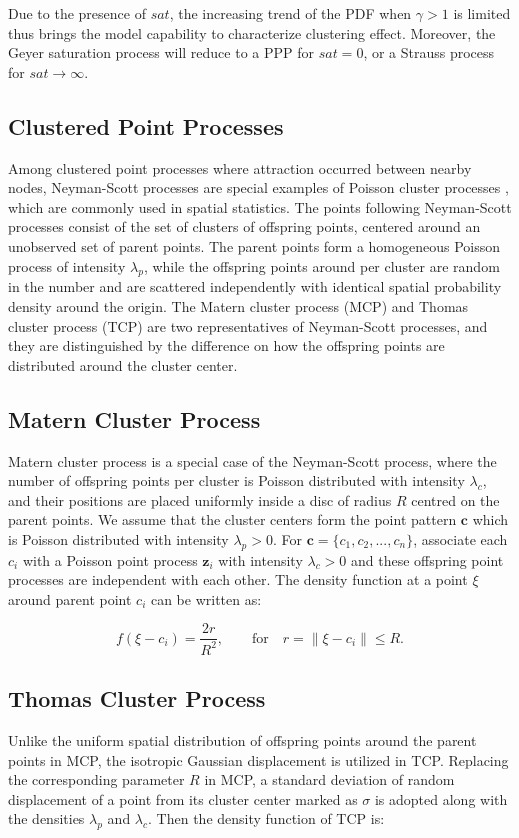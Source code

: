 Due to the presence of $sat$, the increasing trend of the PDF when $\gamma>1$ is limited thus brings the model capability to characterize clustering effect. Moreover, the Geyer saturation process will reduce to a PPP for $sat=0$, or a Strauss process for $sat\to\infty$.

\subsection{Clustered Point Processes}
Among clustered point processes where attraction occurred between nearby nodes, Neyman-Scott processes are special examples of Poisson cluster processes \cite{chiu2013stochastic}, which are commonly used in spatial statistics. The points following Neyman-Scott processes consist of the set of clusters of offspring points, centered around an unobserved set of parent points. The parent points form a homogeneous Poisson process of intensity $\lambda_p$, while the offspring points around per cluster are random in the number and are scattered independently with identical spatial probability density around the origin. The Matern cluster process (MCP) and Thomas cluster process (TCP) are two representatives of Neyman-Scott processes, and they are distinguished by the difference on how the offspring points are distributed around the cluster center.

\subsection*{Matern Cluster Process}
Matern cluster process is a special case of the Neyman-Scott process, where the number of offspring points per cluster is Poisson distributed with intensity $\lambda_c$, and their positions are placed uniformly inside a disc of radius $R$ centred on the parent points. We assume that the cluster centers form the point pattern $\mathbf{c}$ which is Poisson distributed with intensity $\lambda_p>0$. For $\mathbf{c}=\{c_1,c_2,...,c_n\}$, associate each $c_i$ with a Poisson point process $\mathbf{z}_i$ with intensity $\lambda_c>0$ and these offspring point processes are independent with each other. The density function at a point $\xi$ around parent point $c_i$ can be written as:

\begin{equation} \label{matern}
f(\xi-c_i)=\frac{2r}{R^2}, \qquad \text{for} \quad r=\parallel\xi-c_i\parallel \leq R.
\end{equation}

\subsection*{Thomas Cluster Process}
Unlike the uniform spatial distribution of offspring points around the parent points in MCP, the isotropic Gaussian displacement is utilized in TCP. Replacing the corresponding parameter $R$ in MCP, a standard deviation of random displacement of a point from its cluster center marked as {$\sigma$} is adopted along with the densities $\lambda_p$ and $\lambda_c$. Then the density function of TCP is:

